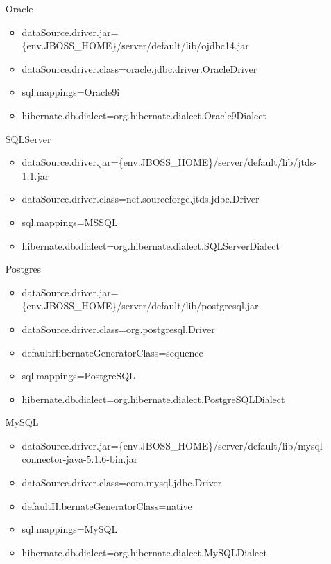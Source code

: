 \begin{itemize}
	\item [Oracle] \hfill
	\begin{itemize}
		\item dataSource.driver.jar=\textdollar{}\{env.JBOSS\_HOME\}/server/default/lib/ojdbc14.jar
		\item dataSource.driver.class=oracle.jdbc.driver.OracleDriver
		\item sql.mappings=Oracle9i
		\item hibernate.db.dialect=org.hibernate.dialect.Oracle9Dialect
	\end{itemize}
	\item [SQLServer] \hfill
	\begin{itemize}
		\item dataSource.driver.jar=\textdollar{}\{env.JBOSS\_HOME\}/server/default/lib/jtds-1.1.jar
		\item dataSource.driver.class=net.sourceforge.jtds.jdbc.Driver
		\item sql.mappings=MSSQL
		\item hibernate.db.dialect=org.hibernate.dialect.SQLServerDialect
	\end{itemize} 
	\item [Postgres] \hfill
	\begin{itemize}
		\item dataSource.driver.jar=\textdollar{}\{env.JBOSS\_HOME\}/server/default/lib/postgresql.jar
		\item dataSource.driver.class=org.postgresql.Driver
		\item defaultHibernateGeneratorClass=sequence
		\item sql.mappings=PostgreSQL
		\item hibernate.db.dialect=org.hibernate.dialect.PostgreSQLDialect
	\end{itemize}
	\item [MySQL] \hfill
	\begin{itemize}
		\item dataSource.driver.jar=\textdollar{}\{env.JBOSS\_HOME\}/server/default/lib/mysql-connector-java-5.1.6-bin.jar
		\item dataSource.driver.class=com.mysql.jdbc.Driver
		\item defaultHibernateGeneratorClass=native
		\item sql.mappings=MySQL
		\item hibernate.db.dialect=org.hibernate.dialect.MySQLDialect
	\end{itemize}
\end{itemize}

